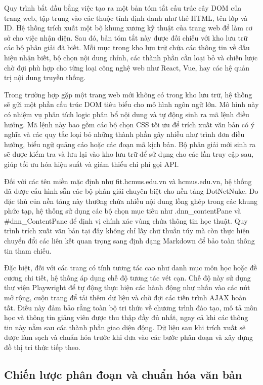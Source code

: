 \indent Quy trình bắt đầu bằng việc tạo ra một bản tóm tắt cấu trúc cây DOM của trang web, tập trung vào các thuộc tính định danh như thẻ HTML, tên lớp và ID. Hệ thống trích xuất một bộ khung xương kỹ thuật của trang web để làm cơ sở cho việc nhận diện. Sau đó, bản tóm tắt này được đối chiếu với kho lưu trữ các bộ phân giải đã biết. Mỗi mục trong kho lưu trữ chứa các thông tin về dấu hiệu nhận biết, bộ chọn nội dung chính, các thành phần cần loại bỏ và chiến lược chờ đợi phù hợp cho từng loại công nghệ web như React, Vue, hay các hệ quản trị nội dung truyền thống.

\indent Trong trường hợp gặp một trang web mới không có trong kho lưu trữ, hệ thống sẽ gửi một phần cấu trúc DOM tiêu biểu cho mô hình ngôn ngữ lớn. Mô hình này có nhiệm vụ phân tích logic phân bổ nội dung và tự động sinh ra mã lệnh điều hướng. Mã lệnh này bao gồm các bộ chọn CSS tối ưu để trích xuất văn bản có ý nghĩa và các quy tắc loại bỏ những thành phần gây nhiễu như trình đơn điều hướng, biểu ngữ quảng cáo hoặc các đoạn mã kịch bản. Bộ phân giải mới sinh ra sẽ được kiểm tra và lưu lại vào kho lưu trữ để sử dụng cho các lần truy cập sau, giúp tối ưu hóa hiệu suất và giảm thiểu chi phí gọi API.

\indent Đối với các tên miền mặc định như fit.hcmus.edu.vn và hcmus.edu.vn, hệ thống đã được cấu hình sẵn các bộ phân giải chuyên biệt cho nền tảng DotNetNuke. Do đặc thù của nền tảng này thường chứa nhiều nội dung lồng ghép trong các khung phức tạp, hệ thống sử dụng các bộ chọn mục tiêu như .dnn\_contentPane và \#dnn\_ContentPane để định vị chính xác vùng chứa thông tin học thuật. Quy trình trích xuất văn bản tại đây không chỉ lấy chữ thuần túy mà còn thực hiện chuyển đổi các liên kết quan trọng sang định dạng Markdown để bảo toàn thông tin tham chiếu.

\indent Đặc biệt, đối với các trang có tính tương tác cao như danh mục môn học hoặc đề cương chi tiết, hệ thống áp dụng chế độ tương tác vét cạn. Chế độ này sử dụng thư viện Playwright để tự động thực hiện các hành động như nhấn vào các nút mở rộng, cuộn trang để tải thêm dữ liệu và chờ đợi các tiến trình AJAX hoàn tất. Điều này đảm bảo rằng toàn bộ tri thức về chương trình đào tạo, mô tả môn học và thông tin giảng viên được thu thập đầy đủ nhất, ngay cả khi các thông tin này nằm sau các thành phần giao diện động. Dữ liệu sau khi trích xuất sẽ được làm sạch và chuẩn hóa trước khi đưa vào các bước phân đoạn và xây dựng đồ thị tri thức tiếp theo.

\subsection{Chiến lược phân đoạn và chuẩn hóa văn bản}


